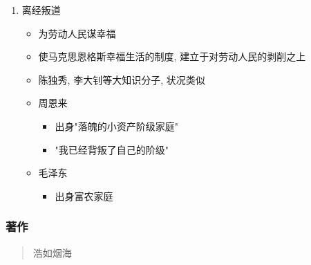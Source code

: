 \documentclass[11pt]{article}
\begin{document}
\begin{enumerate}
\item 离经叛道
\label{sec:org087d305}
\begin{itemize}
\item 为劳动人民谋幸福
\item 使马克思恩格斯幸福生活的制度, 建立于对劳动人民的剥削之上
\item 陈独秀, 李大钊等大知识分子, 状况类似
\item 周恩来
\begin{itemize}
\item 出身"落魄的小资产阶级家庭"
\item "我已经背叛了自己的阶级"
\end{itemize}
\item 毛泽东
\begin{itemize}
\item 出身富农家庭
\end{itemize}
\end{itemize}
\end{enumerate}

\subsubsection{著作}
\label{sec:org298a42b}

\begin{quote}
浩如烟海
\end{quote}
\end{document}
